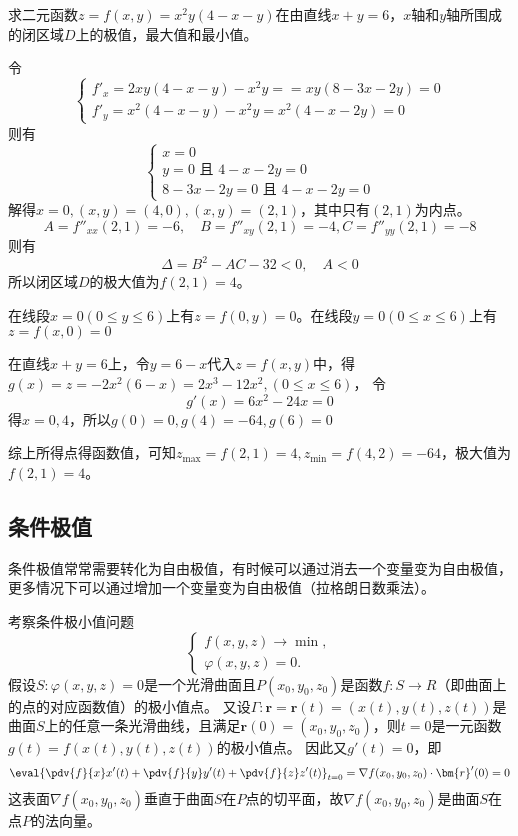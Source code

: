 \begin{example}
    求二元函数$z=f(x,y)=x^2y(4-x-y)$在由直线$x+y=6$，$x$轴和$y$轴所围成的闭区域$D$上的极值，最大值和最小值。
\end{example}
\begin{solution}
    令
    \[
        \begin{cases}
            f'_x  = 2xy(4-x-y) - x^2y = = xy(8-3x-2y) =  0 \\
            f'_y  = x^2(4-x-y) - x^2y = x^2(4-x-2y) = 0
        \end{cases}
    \]
    则有
    \[
        \begin{cases}
            x = 0                        \\
            y = 0 \text{ 且~} 4-x-2y = 0 \\
            8-3x-2y = 0 \text{ 且~} 4-x-2y = 0
        \end{cases}
    \]
    解得$x=0, (x,y)=(4,0), (x,y)=(2,1)$，其中只有$(2,1)$为内点。
    \[ A = f''_{xx}(2,1) = -6 ,\quad B = f''_{xy}(2,1) = -4, C = f''_{yy}(2,1) = -8 \]
    则有
    \[ \Delta = B^2 -AC -32 < 0,\quad A < 0 \]
    所以闭区域$D$的极大值为$f(2,1)=4$。

    在线段$x=0(0\leq y \leq 6)$上有$z=f(0,y)=0$。在线段$y=0(0\leq x\leq 6)$上有$z=f(x,0)=0$

    在直线$x+y=6$上，令$y=6-x$代入$z=f(x,y)$中，得$g(x) = z =-2x^2(6-x)=2x^3-12x^2,(0\leq x\leq 6)$，
    令
    \[ g'(x) = 6x^2 -24x =0 \]
    得$x = {0, 4}$，所以$g(0) = 0, g(4) = -64, g(6) = 0$

    综上所得点得函数值，可知$z_{\max} = f(2,1) = 4, z_{\min} = f(4,2) = -64$，极大值为$f(2,1)=4$。


\end{solution}

\subsection{条件极值}
条件极值常常需要转化为自由极值，有时候可以通过消去一个变量变为自由极值，更多情况下可以通过增加一个变量变为自由极值（拉格朗日数乘法）。

考察条件极小值问题
\[
    \begin{cases}
        f(x,y,z) \to \min, \\
        \varphi(x,y,z) = 0.
    \end{cases}
\]
假设$S:\varphi(x,y,z)=0$是一个光滑曲面且$P(x_0,y_0,z_0)$是函数$f:S\to R$（即曲面上的点的对应函数值）的极小值点。
又设$\Gamma : \bm{r} = \bm{r}(t) = (x(t),y(t),z(t))$是曲面$S$上的任意一条光滑曲线，且满足$\bm{r}(0)=(x_0,y_0,z_0)$，则$t=0$是一元函数$g(t)=f(x(t),y(t),z(t))$的极小值点。
因此又$g'(t)=0$，即
\[
    \eval{\pdv{f}{x}x'(t) + \pdv{f}{y}y'(t) + \pdv{f}{z}z'(t)}_{t=0}
    =
    \nabla f(x_0,y_0,z_0) \cdot \bm{r}'(0) = 0
\]
这表面$\nabla f(x_0,y_0,z_0)$垂直于曲面$S$在$P$点的切平面，故$\nabla f(x_0,y_0,z_0)$是曲面$S$在点$P$的法向量。

